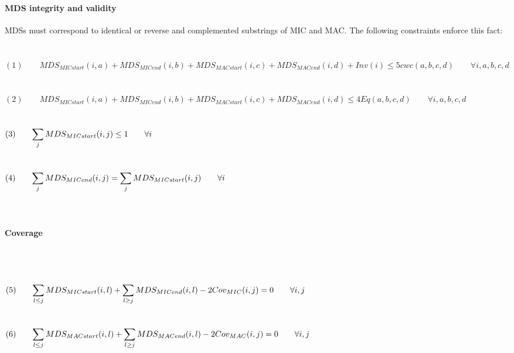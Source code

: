 \paragraph{MDS integrity and validity}MDSs must correspond to identical or reverse and complemented substrings of MIC and MAC. The following constraints enforce this fact:
\\\\\\
$(1) \qquad MDS_{MICstart}(i,a) + MDS_{MICend}(i,b) + MDS_{MACstart}(i,c) + MDS_{MACend}(i,d) + Inv(i) \leq 5 cwc(a,b,c,d) \label{eq:someequation} \qquad \forall i,a,b,c,d$ \\\\\\
$(2) \qquad MDS_{MICstart}(i,a) + MDS_{MICend}(i,b) + MDS_{MACstart}(i,c) + MDS_{MACend}(i,d) \leq 4 Eq(a,b,c,d) \qquad \forall i,a,b,c,d $ \\\\\\
$(3) \qquad \mathlarger{\sum_{j} MDS_{MICstart}(i,j)\leq 1 \qquad \forall i}$ \\\\\\
$(4) \qquad \mathlarger{\sum_{j} MDS_{MICend}(i,j) = \sum_{j} MDS_{MICstart}(i,j) \qquad \forall i}$ \\\\\\

\paragraph{Coverage} $ $
\\\\\\
$(5) \qquad \mathlarger{\sum_{l\leq j} MDS_{MICstart}(i,l) + \sum_{l\geq j}MDS_{MICend}(i,l) - 2Cov_{MIC}(i,j) = 0} \qquad \forall i,j $ \\\\\\
$(6) \qquad \mathlarger{\sum_{l\leq j} MDS_{MACstart}(i,l) + \sum_{l\geq j}MDS_{MACend}(i,l) - 2Cov_{MAC}(i,j) = 0} \qquad \forall i,j $ \\\\\\

